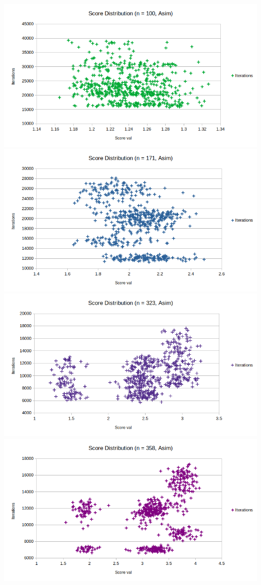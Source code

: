 \documentclass{article}
\begin{document}
\includegraphics[scale=0.36]{asimDist100}
\includegraphics[scale=0.36]{asimDist171}
\includegraphics[scale=0.36]{asimDist323}
\includegraphics[scale=0.36]{asimDist358}
\end{document}
